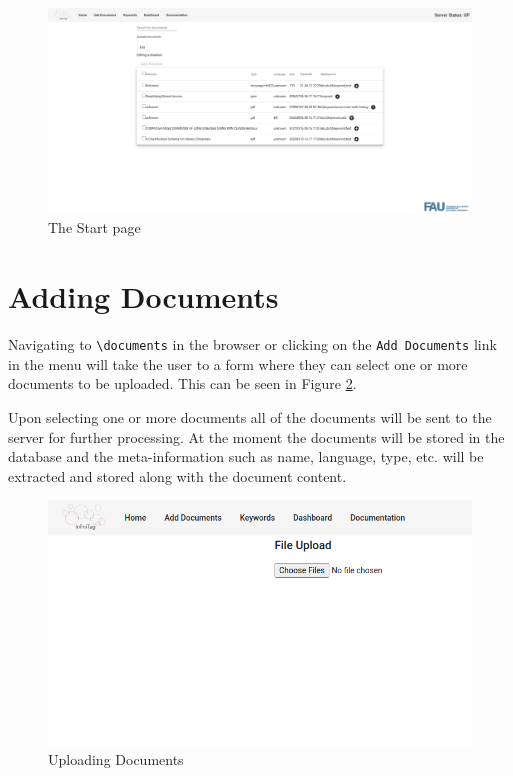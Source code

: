 \documentclass{article}
\begin{document}
\begin{figure}
    \centering
    \includegraphics[scale=0.25]{img/doc1.png}
    \caption{The Start page}
    \label{fig:start_page}
\end{figure}

\section{Adding Documents}
Navigating to \verb|\documents| in the browser or clicking on the \verb|Add Documents| link in the menu will take the user to a form where they can select one or more documents to be uploaded. This can be seen in Figure \ref{fig:doc_upload}.

Upon selecting one or more documents all of the documents will be sent to the server for further processing. At the moment the documents will be stored in the database and the meta-information such as name, language, type, etc. will be extracted and stored along with the document content.

\begin{figure}
    \centering
    \includegraphics[scale=0.4]{img/doc2.png}
    \caption{Uploading Documents}
    \label{fig:doc_upload}
\end{figure}
\end{document}
